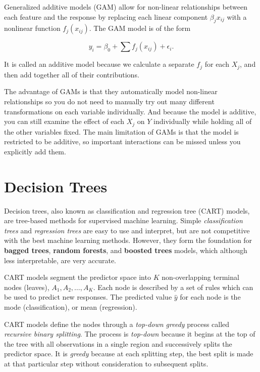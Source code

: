 \documentclass[
]{book}
\begin{document}
Generalized additive models (GAM) allow for non-linear relationships between each feature and the response by replacing each linear component \(\beta_j x_{ij}\) with a nonlinear function \(f_j(x_{ij})\). The GAM model is of the form

\[y_i = \beta_0 + \sum{f_j(x_{ij})} + \epsilon_i.\]

It is called an additive model because we calculate a separate \(f_j\) for each \(X_j\), and then add together all of their contributions.

The advantage of GAMs is that they automatically model non-linear relationships so you do not need to manually try out many diﬀerent transformations on each variable individually. And because the model is additive, you can still examine the eﬀect of each \(X_j\) on \(Y\) individually while holding all of the other variables ﬁxed. The main limitation of GAMs is that the model is restricted to be additive, so important interactions can be missed unless you explicitly add them.

\hypertarget{decision-trees}{%
\chapter{Decision Trees}\label{decision-trees}}

Decision trees, also known as classification and regression tree (CART) models, are tree-based methods for supervised machine learning. Simple \emph{classification trees} and \emph{regression trees} are easy to use and interpret, but are not competitive with the best machine learning methods. However, they form the foundation for \textbf{bagged trees}, \textbf{random forests}, and \textbf{boosted trees} models, which although less interpretable, are very accurate.

CART models segment the predictor space into \(K\) non-overlapping terminal nodes (leaves), \(A_1, A_2, \dots, A_K\). Each node is described by a set of rules which can be used to predict new responses. The predicted value \(\hat{y}\) for each node is the mode (classification), or mean (regression).

CART models define the nodes through a \emph{top-down greedy} process called \emph{recursive binary splitting}. The process is \emph{top-down} because it begins at the top of the tree with all observations in a single region and successively splits the predictor space. It is \emph{greedy} because at each splitting step, the best split is made at that particular step without consideration to subsequent splits.
\end{document}
